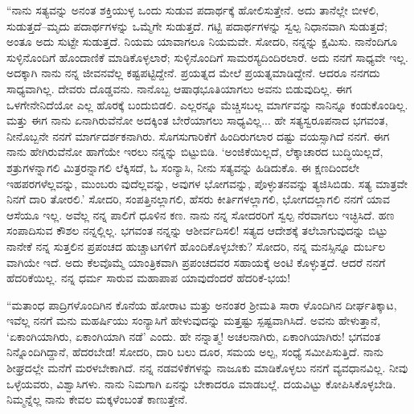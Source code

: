 “ನಾನು ಸತ್ಯವನ್ನು ಅನಂತ ಶಕ್ತಿಯುಳ್ಳ ಒಂದು ಸುಡುವ ಪದಾರ್ಥಕ್ಕೆ ಹೋಲಿಸುತ್ತೇನೆ. ಅದು ತಾನೆಲ್ಲೇ ಬೀಳಲಿ, ಸುಡುತ್ತದೆ–ಮೃದು ಪದಾರ್ಥಗಳನ್ನು ಒಮ್ಮೆಗೇ ಸುಡುತ್ತದೆ. ಗಟ್ಟಿ ಪದಾರ್ಥಗಳನ್ನು ಸ್ವಲ್ಪ ನಿಧಾನವಾಗಿ ಸುಡುತ್ತದೆ; ಅಂತೂ ಅದು ಸುಟ್ಟೇ ಸುಡುತ್ತದೆ. ನಿಯಮ ಯಾವಾಗಲೂ ನಿಯಮವೇ. ಸೋದರಿ, ನನ್ನನ್ನು ಕ್ಷಮಿಸು. ನಾನೆಂದಿಗೂ ಸುಳ್ಳಿನೊಂದಿಗೆ ಹೊಂದಾಣಿಕೆ ಮಾಡಿಕೊಳ್ಳಲಾರೆ; ಸುಳ್ಳಿನೊಂದಿಗೆ ಸಾಮರಸ್ಯದಿಂದಿರಲಾರೆ. ಅದು ನನಗೆ ಸಾಧ್ಯವೇ ಇಲ್ಲ. ಅದಕ್ಕಾಗಿ ನಾನು ನನ್ನ ಜೀವನವೆಲ್ಲ ಕಷ್ಟಪಟ್ಟಿದ್ದೇನೆ. ಪ್ರಯತ್ನದ ಮೇಲೆ ಪ್ರಯತ್ನಮಾಡಿದ್ದೇನೆ. ಆದರೂ ನನಗದು ಸಾಧ್ಯವಾಗಿಲ್ಲ. ದೇವರು ದೊಡ್ಡವನು. ನಾನೊಬ್ಬ ಆಷಾಢಭೂತಿಯಾಗಲು ಅವನು ಬಿಡುವುದಿಲ್ಲ. ಈಗ ಒಳಗೇನೇನಿದೆಯೋ ಎಲ್ಲ ಹೊರಕ್ಕೆ ಬಂದುಬಿಡಲಿ. ಎಲ್ಲರನ್ನೂ ಮೆಚ್ಚಿಸಬಲ್ಲ ಮಾರ್ಗವನ್ನು ನಾನಿನ್ನೂ ಕಂಡುಕೊಂಡಿಲ್ಲ. ಮತ್ತು ಈಗ ನಾನು ಏನಾಗಿರುವೆನೋ ಅದಕ್ಕಿಂತ ಬೇರೆಯಾಗಲು ಸಾಧ್ಯವಿಲ್ಲ... ಹೇ ಸತ್ಯಸ್ವರೂಪನಾದ ಭಗವಂತ, ನೀನೊಬ್ಬನೇ ನನಗೆ ಮಾರ್ಗದರ್ಶಕನಾಗಿರು. ಸೊಗಸುಗಾರಿಕೆಗೆ ಹಿಂದಿರುಗಲಾರ ದಷ್ಟು ವಯಸ್ಸಾಗಿದೆ ನನಗೆ. ಈಗ ನಾನು ಹೇಗಿರುವೆನೋ ಹಾಗೆಯೇ ಇರಲು ನನ್ನನ್ನು ಬಿಟ್ಟುಬಿಡಿ. ‘ಅಂಜಿಕೆಯಿಲ್ಲದೆ, ಲೆಕ್ಕಾಚಾರದ ಬುದ್ಧಿಯಿಲ್ಲದೆ, ಶತ್ರುಗಳನ್ನಾಗಲಿ ಮಿತ್ರರನ್ನಾಗಲಿ ಲೆಕ್ಕಿಸದೆ, ಓ ಸಂನ್ಯಾಸಿ, ನೀನು ಸತ್ಯವನ್ನು ಹಿಡಿದುಕೊ. ಈ ಕ್ಷಣದಿಂದಲೇ ಇಹಪರಗಳೆಲ್ಲವನ್ನು, ಮುಂಬರು ವುದೆಲ್ಲವನ್ನು, ಅವುಗಳ ಭೋಗವನ್ನು, ಪೊಳ್ಳುತನವನ್ನು ತ್ಯಜಿಸಿಬಿಡು. ಸತ್ಯ ಮಾತ್ರವೇ ನಿನಗೆ ದಾರಿ ತೋರಲಿ.’ ಸೋದರಿ, ಸಂಪತ್ತಿನಲ್ಲಾಗಲಿ, ಹೆಸರು ಕೀರ್ತಿಗಳಲ್ಲಾಗಲಿ, ಭೋಗದಲ್ಲಾಗಲಿ ನನಗೆ ಯಾವ ಆಸೆಯೂ ಇಲ್ಲ. ಅವೆಲ್ಲ ನನ್ನ ಪಾಲಿಗೆ ಧೂಳಿನ ಕಣ. ನಾನು ನನ್ನ ಸೋದರರಿಗೆ ಸ್ವಲ್ಪ ನೆರವಾಗಲು ಇಚ್ಛಿಸಿದೆ. ಹಣ ಸಂಪಾದಿಸುವ ಕೌಶಲ ನನ್ನಲ್ಲಿಲ್ಲ. ಭಗವಂತ ನನ್ನನ್ನು ಆಶೀರ್ವದಿಸಲಿ! ಸತ್ಯದ ಆದೇಶಕ್ಕೆ ತಲೆಬಾಗುವುದನ್ನು ಬಿಟ್ಟು ನಾನೇಕೆ ನನ್ನ ಸುತ್ತಲಿನ ಪ್ರಪಂಚದ ಹುಚ್ಚಾಟಗಳಿಗೆ ಹೊಂದಿಕೊಳ್ಳಬೇಕು? ಸೋದರಿ, ನನ್ನ ಮನಸ್ಸಿನ್ನೂ ದುರ್ಬಲ ವಾಗಿಯೇ ಇದೆ. ಅದು ಕೆಲವೊಮ್ಮೆ ಯಾಂತ್ರಿಕವಾಗಿ ಪ್ರಪಂಚದವರ ಸಹಾಯಕ್ಕೆ ಅಂಟಿ ಕೊಳ್ಳುತ್ತದೆ. ಆದರೆ ನನಗೆ ಹೆದರಿಕೆಯಿಲ್ಲ. ನನ್ನ ಧರ್ಮ ಸಾರುವ ಮಹಾಪಾಪ ಯಾವುದೆಂದರೆ ಹೆದರಿಕೆ-ಭಯ!

“ಮತಾಂಧ ಪಾದ್ರಿಗಳೊಂದಿಗಿನ ಕೊನೆಯ ಹೋರಾಟ ಮತ್ತು ಅನಂತರ ಶ್ರೀಮತಿ ಸಾರಾ ಳೊಂದಿಗಿನ ದೀರ್ಘತಿಕ್ಕಾಟ, ಇವೆಲ್ಲ ನನಗೆ ಮನು ಮಹರ್ಷಿಯು ಸಂನ್ಯಾಸಿಗೆ ಹೇಳುವುದನ್ನು ಮತ್ತಷ್ಟು ಸ್ಪಷ್ಟವಾಗಿಸಿದೆ. ಅವನು ಹೇಳುತ್ತಾನೆ, ‘ಏಕಾಂಗಿಯಾಗಿರು, ಏಕಾಂಗಿಯಾಗಿ ನಡೆ’ ಎಂದು. ಹೇ ನನ್ನಾತ್ಮ! ಅಚಲನಾಗಿರು, ಏಕಾಂಗಿಯಾಗಿರು! ಭಗವಂತ ನಿನ್ನೊಂದಿಗಿದ್ದಾನೆ, ಹೆದರಬೇಡ! ಸೋದರಿ, ದಾರಿ ಬಲು ದೂರ, ಸಮಯ ಅಲ್ಪ, ಸಂಧ್ಯೆ ಸಮೀಪಿಸುತ್ತಿದೆ. ನಾನು ಶೀಘ್ರದಲ್ಲೇ ಮನೆಗೆ ಮರಳಬೇಕಾಗಿದೆ. ನನ್ನ ನಡವಳಿಕೆಗಳನ್ನು ನಾಜೂಕು ಮಾಡಿಕೊಳ್ಳಲು ನನಗೆ ವ್ಯವಧಾನವಿಲ್ಲ. ನೀವು ಒಳ್ಳೆಯವರು, ವಿಶ್ವಾಸಿಗಳು. ನಾನು ನಿಮಗಾಗಿ ಏನನ್ನು ಬೇಕಾದರೂ ಮಾಡಬಲ್ಲೆ. ದಯವಿಟ್ಟು ಕೋಪಿಸಿಕೊಳ್ಳಬೇಡಿ. ನಿಮ್ಮನ್ನೆಲ್ಲ ನಾನು ಕೇವಲ ಮಕ್ಕಳೆಂಬಂತೆ ಕಾಣುತ್ತೇನೆ.

